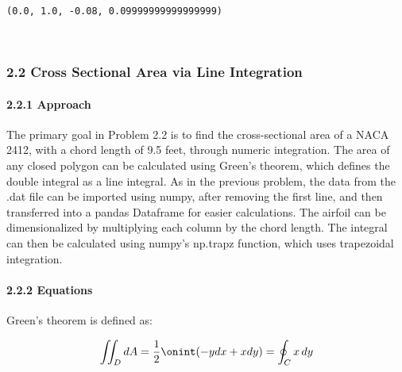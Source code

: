 \documentclass[11pt]{article}
\makeatletter
\newcommand{\boxspacing}{\kern\kvtcb@left@rule\kern\kvtcb@boxsep}
\newcommand{\prompt}[4]{
        {\ttfamily\llap{{\color{#2}[#3]:\hspace{3pt}#4}}\vspace{-\baselineskip}}
    }
\makeatother
\begin{document}
            \begin{tcolorbox}[breakable, size=fbox, boxrule=.5pt, pad at break*=1mm, opacityfill=0]
\prompt{Out}{outcolor}{4}{\boxspacing}
\begin{Verbatim}[commandchars=\\\{\}]
(0.0, 1.0, -0.08, 0.09999999999999999)
\end{Verbatim}
\end{tcolorbox}
        
    \begin{center}
    \end{center}
    { \hspace*{\fill} \\}
    
    \hypertarget{cross-sectional-area-via-line-integration}{%
\subsubsection{2.2 \textbar{} Cross Sectional Area via Line
Integration}\label{cross-sectional-area-via-line-integration}}

\hypertarget{approach}{%
\paragraph{2.2.1 \textbar{} Approach}\label{approach}}

The primary goal in Problem 2.2 is to find the cross-sectional area of a
NACA 2412, with a chord length of 9.5 feet, through numeric integration.
The area of any closed polygon can be calculated using Green's theorem,
which defines the double integral as a line integral. As in the previous
problem, the data from the .dat file can be imported using numpy, after
removing the first line, and then transferred into a pandas Dataframe
for easier calculations. The airfoil can be dimensionalized by
multiplying each column by the chord length. The integral can then be
calculated using numpy's np.trapz function, which uses trapezoidal
integration.

\hypertarget{equations}{%
\paragraph{2.2.2 \textbar{} Equations}\label{equations}}

Green's theorem is defined as:

\[\begin{equation}
    \iint_D dA = \frac{1}{2} \onint(-ydx + xdy) = \oint_C x \, dy
\end{equation}\]
\end{document}
